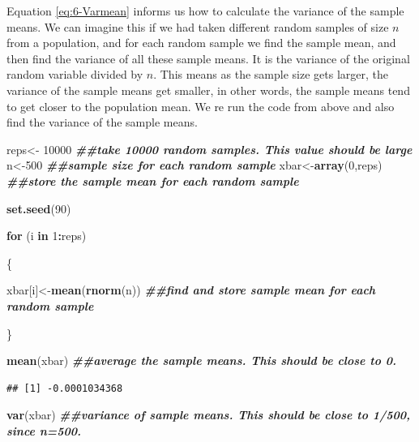 \documentclass[
]{book}
\newenvironment{Shaded}{\begin{snugshade}}{\end{snugshade}}
\newcommand{\ControlFlowTok}[1]{\textcolor[rgb]{0.13,0.29,0.53}{\textbf{#1}}}
\newcommand{\DecValTok}[1]{\textcolor[rgb]{0.00,0.00,0.81}{#1}}
\newcommand{\DocumentationTok}[1]{\textcolor[rgb]{0.56,0.35,0.01}{\textbf{\textit{#1}}}}
\newcommand{\FunctionTok}[1]{\textcolor[rgb]{0.13,0.29,0.53}{\textbf{#1}}}
\newcommand{\NormalTok}[1]{#1}
\newcommand{\OtherTok}[1]{\textcolor[rgb]{0.56,0.35,0.01}{#1}}
\newcommand{\SpecialCharTok}[1]{\textcolor[rgb]{0.81,0.36,0.00}{\textbf{#1}}}
\begin{document}
Equation \eqref{eq:6-Varmean} informs us how to calculate the variance of the sample means. We can imagine this if we had taken different random samples of size \(n\) from a population, and for each random sample we find the sample mean, and then find the variance of all these sample means. It is the variance of the original random variable divided by \(n\). This means as the sample size gets larger, the variance of the sample means get smaller, in other words, the sample means tend to get closer to the population mean. We re run the code from above and also find the variance of the sample means.

\begin{Shaded}
\begin{Highlighting}[]
\NormalTok{reps}\OtherTok{\textless{}{-}} \DecValTok{10000} \DocumentationTok{\#\#take 10000 random samples. This value should be large}
\NormalTok{n}\OtherTok{\textless{}{-}}\DecValTok{500} \DocumentationTok{\#\#sample size for each random sample}
\NormalTok{xbar}\OtherTok{\textless{}{-}}\FunctionTok{array}\NormalTok{(}\DecValTok{0}\NormalTok{,reps) }\DocumentationTok{\#\#store the sample mean for each random sample}

\FunctionTok{set.seed}\NormalTok{(}\DecValTok{90}\NormalTok{)}

\ControlFlowTok{for}\NormalTok{ (i }\ControlFlowTok{in} \DecValTok{1}\SpecialCharTok{:}\NormalTok{reps)}
  
\NormalTok{\{}
  
\NormalTok{  xbar[i]}\OtherTok{\textless{}{-}}\FunctionTok{mean}\NormalTok{(}\FunctionTok{rnorm}\NormalTok{(n)) }\DocumentationTok{\#\#find and store sample mean for each random sample}
  
\NormalTok{\}}

\FunctionTok{mean}\NormalTok{(xbar) }\DocumentationTok{\#\#average the sample means. This should be close to 0. }
\end{Highlighting}
\end{Shaded}

\begin{verbatim}
## [1] -0.0001034368
\end{verbatim}

\begin{Shaded}
\begin{Highlighting}[]
\FunctionTok{var}\NormalTok{(xbar) }\DocumentationTok{\#\#variance of sample means. This should be close to 1/500, since n=500. }
\end{Highlighting}
\end{Shaded}
\end{document}
